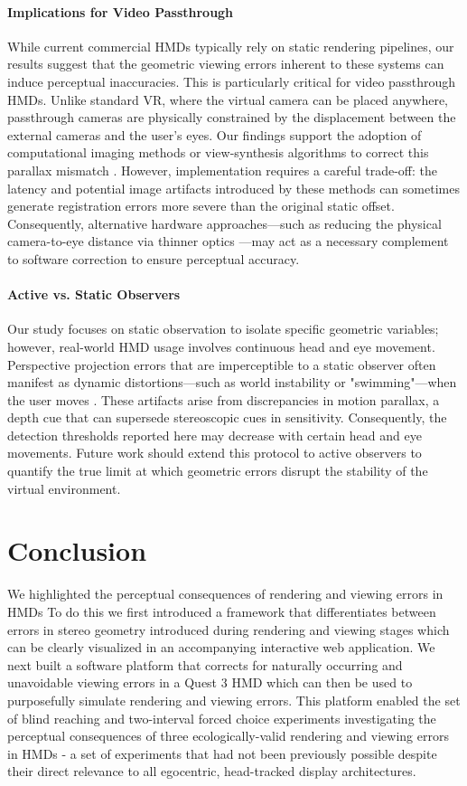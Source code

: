\paragraph{Implications for Video Passthrough}
While current commercial HMDs typically rely on static rendering pipelines, our results suggest that the geometric viewing errors inherent to these systems can induce perceptual inaccuracies. This is particularly critical for video passthrough HMDs. Unlike standard VR, where the virtual camera can be placed anywhere, passthrough cameras are physically constrained by the displacement between the external cameras and the user's eyes. Our findings support the adoption of computational imaging methods \cite{kuo23} or view-synthesis algorithms to correct this parallax mismatch \cite{ElChemalyGAP, xiao2022neuralpassthrough}. However, implementation requires a careful trade-off: the latency and potential image artifacts introduced by these methods can sometimes generate registration errors more severe than the original static offset. Consequently, alternative hardware approaches—such as reducing the physical camera-to-eye distance via thinner optics \cite{maimone2020holographic}—may act as a necessary complement to software correction to ensure perceptual accuracy.

\paragraph{Active vs. Static Observers}
Our study focuses on static observation to isolate specific geometric variables; however, real-world HMD usage involves continuous head and eye movement. Perspective projection errors that are imperceptible to a static observer often manifest as dynamic distortions—such as world instability or "swimming"—when the user moves \cite{guan2023perceptual}. These artifacts arise from discrepancies in motion parallax, a depth cue that can supersede stereoscopic cues in sensitivity. Consequently, the detection thresholds reported here may decrease with certain head and eye movements. Future work should extend this protocol to active observers to quantify the true limit at which geometric errors disrupt the stability of the virtual environment.

\section{Conclusion}
We highlighted the perceptual consequences of rendering and viewing errors in HMDs  To do this we first introduced a framework that differentiates between errors in stereo geometry introduced during rendering and viewing stages which can be clearly visualized in an accompanying interactive web application. We next built a software platform that corrects for naturally occurring and unavoidable viewing errors in a Quest 3 HMD which can then be used to purposefully simulate rendering and viewing errors. This platform enabled the set of blind reaching and two-interval forced choice experiments investigating the perceptual consequences of three ecologically-valid rendering and viewing errors in HMDs - a set of experiments that had not been previously possible despite their direct relevance to all egocentric, head-tracked display architectures.

